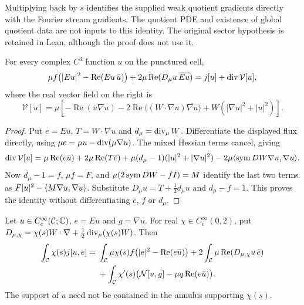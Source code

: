 \begin{remark}
Multiplying back by $s$ identifies the supplied weak quotient gradients
directly with the Fourier stream gradients. The quotient PDE and existence
of global quotient data are not inputs to this identity. The original sector
hypothesis is retained in Lean, although the proof does not use it.
\end{remark}

\begin{lemma}
\label{lem:dd-green}
\leanok
For every complex $C^3$ function $u$ on the punctured cell,
\[
 \mu f\bigl(|Eu|^2-\operatorname{Re}(Eu\,\bar u)\bigr)
 +2\mu\operatorname{Re}(D_\mu u\,\overline{Eu})
 =j[u]+\operatorname{div}\mathcal V[u],
\]
where the real vector field on the right is
\[
 \mathcal V[u]=\mu\left[-\operatorname{Re}(\bar u\nabla u)
 -2\operatorname{Re}\bigl((W\cdot\nabla u)\overline{\nabla u}\bigr)
 +W(|\nabla u|^2+|u|^2)\right].
\]
\end{lemma}

\begin{proof}
\leanok
Put $e=Eu$, $T=W\cdot\nabla u$ and $d_\mu=\operatorname{div}_\mu W$.
Differentiate the displayed flux directly, using
$\mu e=\mu u-\operatorname{div}(\mu\nabla u)$. The mixed Hessian terms cancel, giving
\[
 \operatorname{div}\mathcal V[u]
 =\mu\operatorname{Re}(e\bar u)+2\mu\operatorname{Re}(T\bar e)
  +\mu(d_\mu-1)(|u|^2+|\nabla u|^2)
  -2\mu\langle \operatorname{sym} DW\nabla u,\nabla u\rangle.
\]
Now $d_\mu-1=f$, $\mu f=F$, and
$\mu(2\operatorname{sym} DW-fI)=M$ identify the last two terms as
$F|u|^2-\langle M\nabla u,\nabla u\rangle$.
Substitute $D_\mu u=T+\tfrac12d_\mu u$ and $d_\mu-f=1$.
This proves the identity without differentiating $e$, $f$ or $d_\mu$.
\end{proof}

\begin{lemma}
\label{lem:dd-smooth-green}
\leanok
Let $u\in C_c^\infty(\mathcal{C};\mathbb C)$, $e=Eu$ and $g=\nabla u$.
For real $\chi\in C_c^\infty(0,2)$, put
$D_{\mu,\chi}=\chi(s)W\cdot\nabla+\tfrac12\operatorname{div}_\mu(\chi(s)W)$.
Then
\begin{align*}
 \int_{\mathcal{C}}\chi(s)j[u,e]
 ={}&\int_{\mathcal{C}}\mu\chi(s)f
       \bigl(|e|^2-\operatorname{Re}(e\bar u)\bigr)
       +2\int_{\mathcal{C}}\mu\operatorname{Re}(D_{\mu,\chi}u\,\bar e)\\
 &+\int_{\mathcal{C}}\chi'(s)
       \bigl(\mathcal N[u,g]-\mu q\operatorname{Re}(e\bar u)\bigr).
\end{align*}
The support of $u$ need not be contained in the annulus supporting $\chi(s)$.
\end{lemma}

